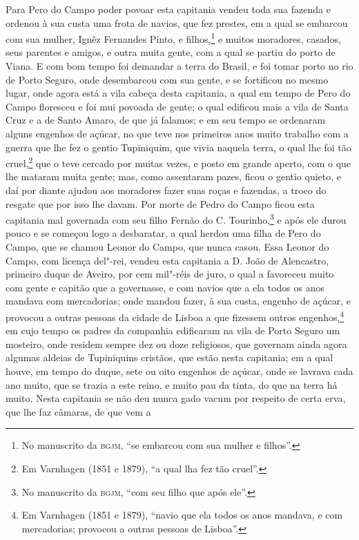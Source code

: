 Para Pero do Campo poder povoar esta capitania vendeu toda sua fazenda e ordenou à sua
custa uma frota de navios, que fez prestes, em a qual se embarcou com sua mulher, Ignêz
Fernandes Pinto, e filhos,\footnote{ No manuscrito da \textsc{bgjm}, ``se embarcou com sua
mulher e filhos''.} e muitos moradores, casados, seus parentes e amigos, e outra muita
gente, com a qual se partiu do porto de Viana. E com bom tempo foi demandar a terra do
Brasil, e foi tomar porto no rio de Porto Seguro, onde desembarcou com sua gente, e se
fortificou no mesmo lugar, onde agora está a vila cabeça desta capitania, a qual em tempo
de Pero do Campo floresceu e foi mui povoada de gente; o qual edificou mais a vila de
Santa Cruz e a de Santo Amaro, de que já falamos; e em seu tempo se ordenaram alguns
engenhos de açúcar, no que teve nos primeiros anos muito trabalho com a guerra que lhe fez
o gentio Tupiniquim, que vivia naquela terra, o qual lhe foi tão cruel,\footnote{ Em
Varnhagen (1851 e 1879), ``a qual lha fez tão cruel''.} que o teve cercado por muitas
vezes, e posto em grande aperto, com o que lhe mataram muita gente; mas, como assentaram
pazes, ficou o gentio quieto, e daí por diante ajudou aos moradores fazer suas roças e
fazendas, a troco do resgate que por isso lhe davam. Por morte de Pedro do Campo ficou
esta capitania mal governada com seu filho Fernão do C. Tourinho,\footnote{ No manuscrito
da \textsc{bgjm}, ``com seu filho que após ele''.} e após ele durou pouco e se começou
logo a desbaratar, a qual herdou uma filha de Pero do Campo, que se chamou Leonor do
Campo, que nunca casou. Essa Leonor do Campo, com licença del"-rei, vendeu esta capitania a
D. João de Alencastro, primeiro duque de Aveiro, por cem mil"-réis de juro, o qual a
favoreceu muito com gente e capitão que a governasse, e com navios que a ela todos os anos
mandava com mercadorias; onde mandou fazer, à sua custa, engenho de açúcar, e provocou a
outras pessoas da cidade de Lisboa a que fizessem outros engenhos,\footnote{ Em Varnhagen
(1851 e 1879), ``navio que ela todos os anos mandava, e com mercadorias; provocou a outras
pessoas de Lisboa''.} em cujo tempo os padres da companhia edificaram na vila de Porto
Seguro um mosteiro, onde residem sempre dez ou doze religiosos, que governam ainda agora
algumas aldeias de Tupiniquins cristãos, que estão nesta capitania; em a qual houve, em
tempo do duque, sete ou oito engenhos de açúcar, onde se lavrava cada ano muito, que se
trazia a este reino, e muito pau da tinta, do que na terra há muito. Nesta capitania se
não deu nunca gado vacum por respeito de certa erva, que lhe faz câmaras, de que vem a
